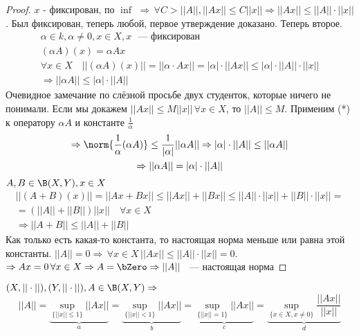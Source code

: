 \documentclass[document]{subfiles}
\begin{document}
\begin{proof}
    $x$ - фиксирован,  по $\inf$ $\Rightarrow \, \forall C > ||A||, ||Ax|| \leq C ||x|| \Rightarrow ||Ax|| \leq ||A|| \cdot ||x||$. Был фиксирован, теперь любой,
     первое утверждение доказано. Теперь второе. 
     \begin{gather*}
        \alpha \in k, \alpha \ne 0, x \in X, x \text{ ~--- фиксирован } \\
        (\alpha A) (x) = \alpha A x \\
        \forall x \in X \quad ||(\alpha A)(x) || = ||\alpha \cdot Ax|| = |\alpha| \cdot ||A x|| \leq |\alpha| \cdot ||A|| \cdot ||x|| \\
        \Rightarrow ||\alpha A|| \leq |\alpha|\cdot ||A|| \tag{*}
     \end{gather*}
     Очевидное замечание по слёзной просьбе двух студенток, которые ничего не понимали.
     Если мы докажем $||Ax|| \leq M||x|| \, \forall x \in X$, то $||A|| \leq M$. Применим (*) к оператору $\alpha A$ и константе $\frac{1}{\alpha}$
     \begin{gather*}
        \Rightarrow \norm{\frac{1}{\alpha}(\alpha A)} \leq \frac{1}{|\alpha|} ||\alpha A|| \Rightarrow |\alpha| \cdot || A|| \leq ||\alpha A|| \\
        \Rightarrow ||\alpha A || = |\alpha|\cdot ||A|| \\
     \end{gather*}
     $ A,B \in \B(X,Y), x \in X  $
     \begin{multline*}
        ||(A+B)(x)|| = ||Ax + Bx|| \leq ||Ax|| + ||Bx|| \leq ||A|| \cdot ||x|| + ||B|| \cdot ||x|| = \\
        = (||A|| + ||B||) ||x|| \quad \forall x \in X \\
        \Rightarrow ||A+B|| \leq ||A||+ ||B||
     \end{multline*}
     Как только есть какая-то константа, то настоящая норма меньше или равна этой константы. $||A|| = 0 \Rightarrow \, \forall x \in X \, ||Ax|| \leq ||A|| \cdot ||x|| = 0$.
     $\Rightarrow Ax = 0 \, \forall x \in X \Rightarrow A = \bZero \Rightarrow ||A||$ ~--- настоящая норма
\end{proof}
 
\begin{theorem}
    $(X, ||\cdot||), (Y, ||\cdot||), A \in \B(X,Y) \Rightarrow$ 
    \[ ||A|| = \underbrace{\sup_{\{||x|| \leq 1\}} ||Ax||}_a = \underbrace{\sup_{\{||x|| < 1\}} ||Ax||}_b = \underbrace{\sup_{\{||x|| = 1\}} ||Ax||}_c = \underbrace{\sup_{\{x \in X, x \ne 0\}} \frac{||Ax||}{||x||}}_d \]
\end{theorem}
 
\end{document}
